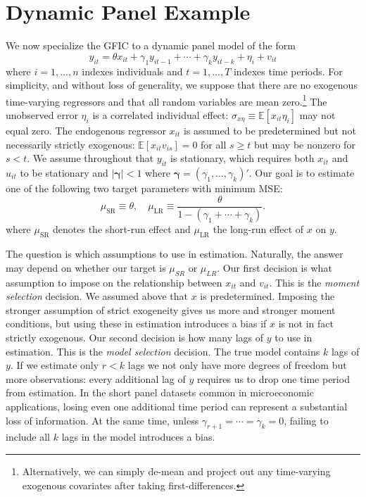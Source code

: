 \section{Dynamic Panel Example}
\label{sec:panel}
We now specialize the GFIC to a dynamic panel model of the form 
\begin{equation}
  y_{it} = \theta x_{it} + \gamma_1 y_{it-1} + \cdots + \gamma_k y_{it-k} + \eta_i + v_{it}
  \label{eq:truepanel}
\end{equation}
where $i = 1, \hdots, n$ indexes individuals and $t=1, \hdots, T$  indexes time periods. 
For simplicity, and without loss of generality, we suppose that there are no exogenous time-varying regressors and that all random variables are mean zero.\footnote{Alternatively, we can simply de-mean and project out any time-varying exogenous covariates after taking first-differences.} 
The unobserved error $\eta_i$ is a correlated individual effect: $\sigma_{x\eta}\equiv \mathbb{E}\left[ x_{it}\eta_i \right]$ may not equal zero. 
The endogenous regressor $x_{it}$ is assumed to be predetermined but not necessarily strictly exogenous: $\mathbb{E}[x_{it} v_{is}]=0$ for all $s \geq t$ but may be nonzero for $s < t$.  
We assume throughout that $y_{it}$ is stationary, which requires both $x_{it}$ and $u_{it}$ to be stationary and $|\boldsymbol{\gamma}| < 1$ where $\boldsymbol{\gamma} = (\gamma_1, \dots, \gamma_k)'$.
Our goal is to estimate one of the following two target parameters with minimum MSE: 
\begin{equation}
  \mu_{\text{SR}} \equiv \theta, \quad \mu_{\text{LR}} \equiv \frac{\theta}{1- (\gamma_1 + \cdots + \gamma_k)}.
  \label{eq:paneltarget}
\end{equation}
where $\mu_{\text{SR}}$ denotes the short-run effect and $\mu_{\text{LR}}$ the long-run effect of $x$ on $y$.

The question is which assumptions to use in estimation.
Naturally, the answer may depend on whether our target is $\mu_{SR}$ or $\mu_{LR}$.
Our first decision is what assumption to impose on the relationship between $x_{it}$ and $v_{it}$.
This is the \emph{moment selection} decision.
We assumed above that $x$ is predetermined.
Imposing the stronger assumption of strict exogeneity gives us more and stronger moment conditions, but using these in estimation introduces a bias if $x$ is not in fact strictly exogenous.
Our second decision is how many lags of $y$ to use in estimation.
This is the \emph{model selection} decision.
The true model contains $k$ lags of $y$.
If we estimate only $r < k$ lags we not only have more degrees of freedom but more observations: every additional lag of $y$ requires us to drop one time period from estimation. 
In the short panel datasets common in microeconomic applications, losing even one additional time period can represent a substantial loss of information.
At the same time, unless $\gamma_{r+1} = \cdots = \gamma_k = 0$, failing to include all $k$ lags in the model introduces a bias.

